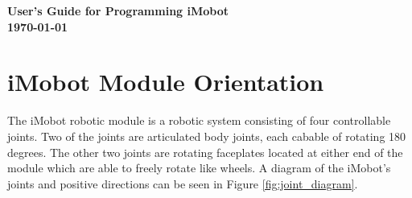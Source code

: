 \documentclass[11pt]{report}
\begin{document}
\thispagestyle{empty}
\begin{center}


\vspace{0.5in}
{\Huge\sf\bf User's Guide for Programming iMobot} \\
\vspace{2.0in}
{\large\sf\bf\today}
\end{center}

\pagebreak

\begin{abstract} 
This user's guide describes how to control an iMobot robotic module. The iMobot
robotic module has four controllable degrees of motion. Each module has two
articulated body joints and two rotating faceplates at the ends of the module.
\end{abstract}
\pagebreak

\setcounter{page}{1}
\tableofcontents
\pagebreak

\setcounter{page}{1}
\pagebreak

\chapter{iMobot Module Orientation}
The iMobot robotic module is a robotic system consisting of four controllable joints. Two
of the joints are articulated body joints, each cabable of rotating 180 degrees. The other
two joints are rotating faceplates located at either end of the module which are able to
freely rotate like wheels. A diagram of the iMobot's joints and positive directions can
be seen in Figure \ref{fig:joint_diagram}.
\end{document}
